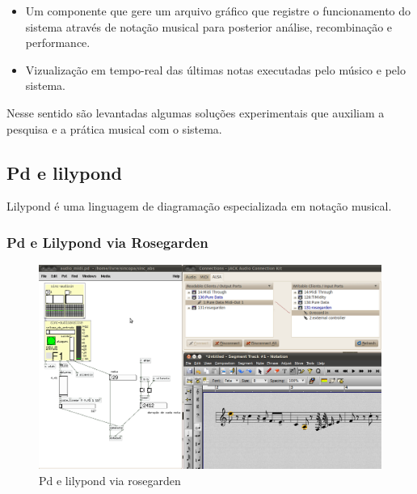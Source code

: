 \documentclass[draft]{ppgmus}
\begin{document}
\begin{itemize}
 \item Um componente que gere um arquivo gráfico que registre o funcionamento
do sistema através de notação musical para posterior análise, recombinação e performance.
 \item Vizualização em tempo-real das últimas notas executadas pelo músico e pelo sistema.
\end{itemize}


Nesse sentido são levantadas algumas soluções experimentais que auxiliam a pesquisa e 
a prática musical com o sistema.


\subsection{Pd e lilypond}

Lilypond é uma linguagem de diagramação especializada
em notação musical.



\subsubsection{Pd e Lilypond via Rosegarden}

\begin{figure}
\includegraphics[scale=.6]{audio2midi}
\caption{Pd e lilypond via rosegarden}
\label{pdlilypond1}
\end{figure} 
\end{document}
